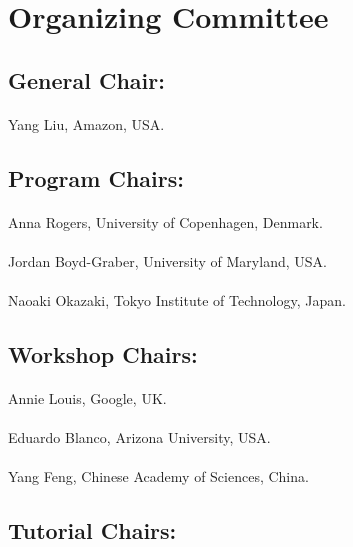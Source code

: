 \section{Organizing Committee}

\subsection*{General Chair:}
\paragraph{} Yang Liu, Amazon, USA. 

\subsection*{Program Chairs:} 
\paragraph{} Anna Rogers, University of Copenhagen, Denmark. 
\paragraph{} Jordan Boyd-Graber, University of Maryland, USA. 
\paragraph{} Naoaki Okazaki, Tokyo Institute of Technology, Japan. 

\subsection*{Workshop Chairs:}
\paragraph{} Annie Louis, Google, UK. 
\paragraph{} Eduardo Blanco, Arizona University, USA. 
\paragraph{} Yang Feng, Chinese Academy of Sciences, China. 

\subsection*{Tutorial Chairs:}
